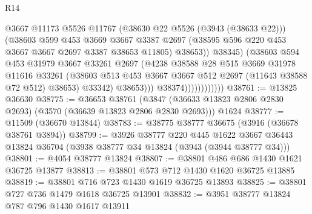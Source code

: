 \begin{lexlean}{R14}
\begin{coremodule}
                                    @3667
                                    @11173
                                    @5526
                                    @11767
                                    (@38630 @22 @5526 (@3943 (@38633 @22)))
                                    (@38603
                                      @599
                                      @453
                                      @3669
                                      @3667
                                      @3387
                                      @2697
                                      (@38595 @596 @220 @453 @3667 @3667 @2697 @3387 @38653 @11805)
                                      @38653))
                                  @38345)
                                (@38603
                                  @594
                                  @453
                                  @31979
                                  @3667
                                  @33261
                                  @2697
                                  (@4238
                                    @38588
                                    @28
                                    @515
                                    @3669
                                    @31978
                                    @11616
                                    @33261
                                    (@38603
                                      @513
                                      @453
                                      @3667
                                      @3667
                                      @512
                                      @2697
                                      (@11643 @38588 @72 @512)
                                      @38653)
                                    @33342)
                                  @38653)))
                            @38374))))))))))))
@38761 := @13825 @36630
@38775 := @36653
    @38761
    (@3847 (@36633 @13823 @2806 @2830 @2693) (@3570 (@36639 @13823 @2806 @2830 @2693)))
    @1624
@38777 := @11509 (@36670 @13844)
@38783 := @38775 @38777 @36675 (@3916 (@36678 @38761 @3894))
@38799 := @3926
    @38777
    @220
    @445
    @1622
    @3667
    @36443
    @13824
    @36704
    (@3938 @38777 @34 @13824 (@3943 (@3944 @38777 @34)))
@38801 := @4054 @38777 @13824
@38807 := @38801 @486 @686 @1430 @1621 @36725 @13877
@38813 := @38801 @573 @712 @1430 @1620 @36725 @13885
@38819 := @38801 @716 @723 @1430 @1619 @36725 @13893
@38825 := @38801 @727 @736 @1479 @1618 @36725 @13901
@38832 := @3951 @38777 @13824 @787 @796 @1430 @1617 @13911

\end{coremodule}
\end{lexlean}

